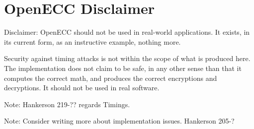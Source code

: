 \section{OpenECC Disclaimer}
\label{app:disclaimer}

Disclaimer: OpenECC should not be used in real-world applications. It exists, in its current form, as
an instructive example, nothing more.

Security against timing attacks is not within the scope of what is produced here. The implementation
does not claim to be safe, in any other sense than that it computes the correct math, and produces
the correct encryptions and decryptions. It should not be used in real software.

Note: Hankerson 219-?? regards Timings.

Note: Consider writing more about implementation issues. Hankerson 205-?